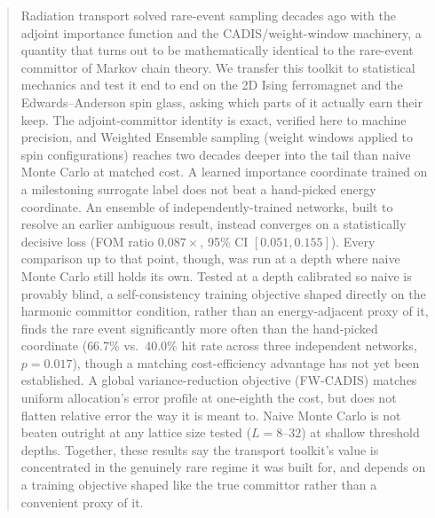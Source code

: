 \documentclass[a4paper,fleqn]{cas-sc}
\begin{document}
\begin{abstract}
	Radiation transport solved rare-event sampling decades ago with the adjoint importance function and the CADIS/weight-window machinery, a quantity that turns out to be mathematically identical to the rare-event committor of Markov chain theory. We transfer this toolkit to statistical mechanics and test it end to end on the 2D Ising ferromagnet and the Edwards--Anderson spin glass, asking which parts of it actually earn their keep. The adjoint-committor identity is exact, verified here to machine precision, and Weighted Ensemble sampling (weight windows applied to spin configurations) reaches two decades deeper into the tail than naive Monte Carlo at matched cost. A learned importance coordinate trained on a milestoning surrogate label does not beat a hand-picked energy coordinate. An ensemble of independently-trained networks, built to resolve an earlier ambiguous result, instead converges on a statistically decisive loss (FOM ratio $0.087\times$, 95\% CI $[0.051,0.155]$). Every comparison up to that point, though, was run at a depth where naive Monte Carlo still holds its own. Tested at a depth calibrated so naive is provably blind, a self-consistency training objective shaped directly on the harmonic committor condition, rather than an energy-adjacent proxy of it, finds the rare event significantly more often than the hand-picked coordinate ($66.7\%$ vs.\ $40.0\%$ hit rate across three independent networks, $p=0.017$), though a matching cost-efficiency advantage has not yet been established. A global variance-reduction objective (FW-CADIS) matches uniform allocation's error profile at one-eighth the cost, but does not flatten relative error the way it is meant to. Naive Monte Carlo is not beaten outright at any lattice size tested ($L=8$--$32$) at shallow threshold depths. Together, these results say the transport toolkit's value is concentrated in the genuinely rare regime it was built for, and depends on a training objective shaped like the true committor rather than a convenient proxy of it.
\end{abstract}
\end{document}

